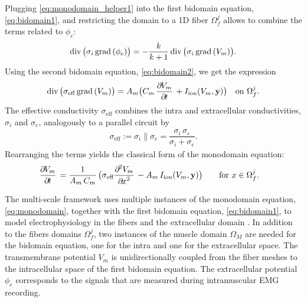 Plugging \cref{eq:monodomain_helper1} into the first bidomain equation, \cref{eq:bidomain1}, and restricting the domain to a 1D fiber $\Omega_f^j$ allows to combine the terms related to $\phi_e$:
%
\begin{align*}
  \hbox{div} \,\big(\sigma_i\,\hbox{grad} \,(\phi_e)\big) = -\displaystyle\frac{\displaystyle{k}}{\displaystyle{k+1}}\, \hbox{div} \,\big(\sigma_i\,\hbox{grad} \,(V_m)\big).
\end{align*}
% 
Using the second bidomain equation, \cref{eq:bidomain2}, we get the expression
%
\begin{align*}
  \div\big(\sigma_\text{eff} \,\grad(V_m)\big) = A_m\big(C_m\,\p{V_m}{t} + I_\text{ion}(V_m,\bfy)\big) \quad \text{on }\Omega_f^j.
\end{align*}
%
The effective conductivity $\sigma_\text{eff}$ combines the intra and extracellular conductivities, $\sigma_i$ and $\sigma_e$, analogously to a parallel circuit by 
%
\begin{align*}
  \sigma_\text{eff} := \sigma_i \parallel \sigma_e = \dfrac{\sigma_i\,\sigma_e}{\sigma_i + \sigma_e}.
\end{align*}
%
Rearranging the terms yields the classical form of the monodomain equation:
%
\begin{align}
  &\dfrac{\partial V_m}{\partial t} = \dfrac{1}{A_m\,C_m}\big(\sigma_\text{eff}\dfrac{\partial^2 V_m}{\partial x^2} - A_m\,I_\text{ion}(V_m,\bfy)\big) \quad && \text{for }x \in \Omega_f^j. \label{eq:monodomain}
\end{align}
%

The multi-scale framework uses multiple instances of the monodomain equation, \cref{eq:monodomain}, together with the first bidomain equation, \cref{eq:bidomain1}, to model electrophysiology in the fibers and the extracellular domain \cite{Mordhorst2015}. In addition to the fibers domains $\Omega_f^j$, two instances of the muscle domain $\Omega_M$ are needed for the bidomain equation, one for the intra and one for the extracellular space. The transmembrane potential $V_m$ is unidirectionally coupled from the fiber meshes to the intracellular space of the first bidomain equation. The extracellular potential $\phi_e$ corresponds to the signals that are measured during intramuscular EMG recording.

